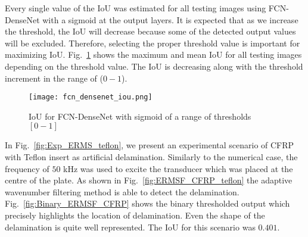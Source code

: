 Every single value of the IoU was estimated for all testing images using FCN-DenseNet with a sigmoid at the output layers.
It is expected that as we increase the threshold, the IoU will decrease because some of the detected output values will be excluded.
Therefore, selecting the proper threshold value is important for maximizing IoU. 
Fig.~\ref{fig:iou_fcn} shows the maximum and mean IoU for all testing images depending on the threshold value. 
The IoU is decreasing along with the threshold increment in the range of (\(0-1\)).
	\begin{figure}[!h] 
		\centering
		\texttt{[image: fcn\_densenet\_iou.png]}
		\centering
		\caption{IoU for FCN-DenseNet with sigmoid of a range of thresholds \([0-1]\)} 
		\label{fig:iou_fcn}
	\end{figure}
	
In Fig.~\ref{fig:Exp_ERMS_teflon}, we present an experimental scenario of CFRP with Teflon insert as artificial delamination.
Similarly to the numerical case, the frequency of \(50\) kHz was used to excite the transducer which was placed at the centre of the plate.
As shown in Fig.~\ref{fig:ERMSF_CFRP_teflon} the adaptive wavenumber filtering method is able to detect the delamination. 
Fig.~\ref{fig:Binary_ERMSF_CFRP} shows the binary thresholded output which precisely highlights the location of delamination. 
Even the shape of the delamination is quite well represented.
The IoU for this scenario was \(0.401\). 

